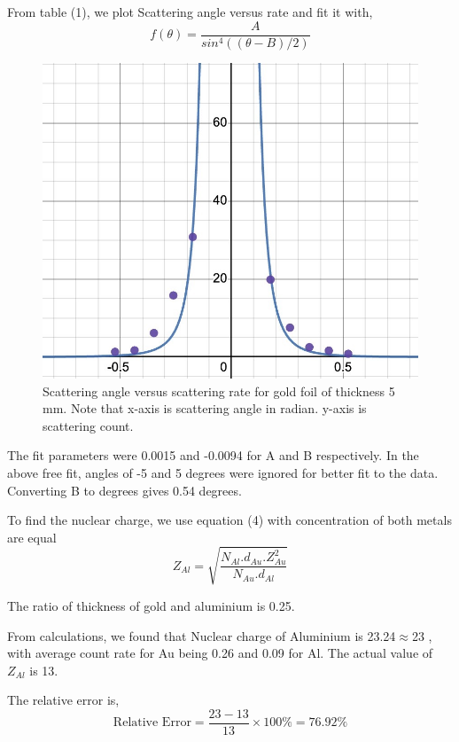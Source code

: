 \documentclass[a4paper, amsfonts, amssymb, amsmath, reprint, showkeys, nofootinbib, twoside]{revtex4-1}
\begin{document}
From table (1), we plot Scattering angle versus rate and fit it with,
\begin{equation}
	f(\theta)=\frac{A}{sin^4((\theta-B)/2)}
\end{equation}

\begin{figure}[H]
	\centering
	\includegraphics[scale=0.3]{5}
	\caption{Scattering angle versus scattering rate for gold foil of thickness 5 mm. Note that x-axis is scattering angle in radian. y-axis is scattering count.}
\end{figure}

The fit parameters were 0.0015 and -0.0094 for A and B respectively. In the above free fit, angles of -5 and 5 degrees were ignored for better fit to the data. Converting B to degrees gives 0.54 degrees.

To find the nuclear charge, we use equation (4)  with concentration of both metals are equal
\begin{equation}
	Z_{Al}=\sqrt{\frac{N_{Al}.d_{Au}.Z_{Au}^2}{N_{Au}.d_{Al}}}
\end{equation}

The ratio of thickness of gold and aluminium is 0.25.

From calculations, we found that Nuclear charge of Aluminium is 23.24$\approx$23 , with average count rate for Au being 0.26 and 0.09 for Al. The actual value of $Z_{Al}$ is 13.

The relative error is,
\begin{equation}
	\text{Relative Error}=\frac{23-13}{13}\times100\%=76.92\%
\end{equation}
\end{document}
